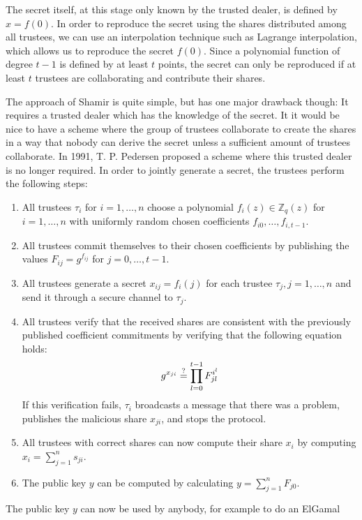 \documentclass[numbers=noenddot, abstract=on, a4paper, headsepline,
footsepline, oneside, openright, draft=off, listof=leveldown]{scrreprt}
\begin{document}
The secret itself, at this stage only known by the trusted dealer, is defined by
$x=f(0)$. In order to reproduce the secret using the shares distributed among
all trustees, we can use an interpolation technique such as Lagrange
interpolation, which allows us to reproduce the secret $f(0)$. Since a
polynomial function of degree $t-1$ is defined by at least $t$ points, the
secret can only be reproduced if at least $t$ trustees are collaborating and
contribute their shares.

The approach of Shamir is quite simple, but has one major drawback though: It
requires a trusted dealer which has the knowledge of the secret. It
it would be nice to have a scheme where the group of trustees collaborate to create
the shares in a way that nobody can derive the secret unless a
sufficient amount of trustees collaborate. In 1991, T. P. Pedersen proposed a scheme
\cite{PED91} where this trusted dealer is no longer required. In order to
jointly generate a secret, the trustees perform the following steps:
\begin{enumerate}
  \item All trustees $\tau_i$ for $i = 1, \ldots, n$ choose a polynomial $f_i(z)
  \in \mathbb{Z}_q(z)$ for $i = 1, \ldots, n$ with uniformly random chosen coefficients $f_{i0}, \ldots,
  f_{i, t-1}$.
  \item All trustees commit themselves to their chosen coefficients by
  publishing the values $F_{ij} = g^{f_{ij}}$ for $j=0,\ldots, t-1$.
  \item All trustees generate a secret $x_{ij} = f_i(j)$ for each
  trustee $\tau_j, j=1,\ldots,n$ and send it through a secure channel to
  $\tau_j$.
  \item All trustees verify that the received shares are consistent with the
  previously published coefficient commitments by verifying that the following
  equation holds:
  \begin{equation}
	g^{x_{ji}} \stackrel{?}{=} \prod_{l=0}^{t-1} F_{jl}^{i^l} \notag
  \end{equation}
  If this verification fails, $\tau_i$ broadcasts a message that there was a
  problem, publishes the malicious share $x_{ji}$, and stops the protocol.
  \item All trustees with correct shares can now compute their share $x_i$ by
  computing $x_i=\sum_{j=1}^n s_{ji}$.
  \item The public key $y$ can be computed by calculating $y=\sum_{j=1}^n
  F_{j0}$.
\end{enumerate}
The public key $y$ can now be used by anybody, for example to do an ElGamal
\end{document}
